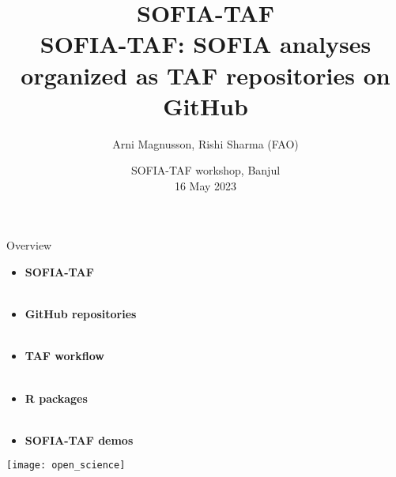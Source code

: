 \documentclass[aspectratio=169]{beamer}
\begin{document}
\begin{frame}
  \title{SOFIA-TAF\\[1ex]
    {\large\darkgreen SOFIA-TAF: SOFIA analyses organized as TAF repositories on GitHub}}
  \author{\vspace{-4ex}
    Arni Magnusson, Rishi Sharma (FAO)}
  \date{SOFIA-TAF workshop, Banjul\\[0.2ex]
    16 May 2023}
  \titlepage
\end{frame}


\begin{frame}{Overview}
  \begin{itemize}
    \item[] {\bf\darkblue SOFIA-TAF}\\[0.1ex]
    \\[2.5ex]
    \item[] {\bf\darkblue GitHub repositories}\\[0.1ex]
    \\[2.5ex]
    \item[] {\bf\darkblue TAF workflow}\\[0.1ex]
    \\[2.5ex]
    \item[] {\bf\darkblue R packages}\\[0.1ex]
    \\[2.5ex]
    \item[] {\bf\darkblue SOFIA-TAF demos}\\[0.1ex]
  \end{itemize}
\end{frame}


\begin{frame}
  \centering
  \vspace{1.5ex}
  \texttt{[image: open\_science]}
\end{frame}

\end{document}
